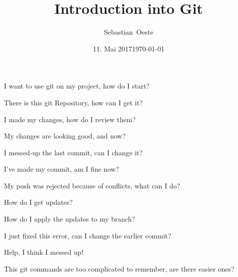 \documentclass[11pt]{beamer}
\date{11. Mai 2017}
\institute[ZIH TUD]{Zentrum f\"{u}r Informationsdienste und Hochleistungsrechnen -- TU Dresden}
\title[LCTP]{Introduction into Git}
\author[Oeste]{Sebastian~Oeste}
\date{\today}
\begin{document}
\zihmaketitle



\begin{frame}[fragile]{I want to use git on my project, how do I start?}
\end{frame}

\begin{frame}[fragile]{There is this git Repository, how can I get it?}
\end{frame}

\begin{frame}[fragile]{I made my changes, how do I review them?}
\end{frame}

\begin{frame}[fragile]{My changes are looking good, and now?}
\end{frame}

\begin{frame}[fragile]{I messed-up the last commit, can I change it?}
\end{frame}

\begin{frame}[fragile]{I've made my commit, am I fine now?}
\end{frame}

\begin{frame}[fragile]{My push was rejected because of conflicts, what can I do?}
\end{frame}

\begin{frame}[fragile]{How do I get updates?}
\end{frame}

\begin{frame}[fragile]{How do I apply the updates to my branch?}
\end{frame}

\begin{frame}[fragile]{I just fixed this error, can I change the earlier commit?}
\end{frame}

\begin{frame}[fragile]{Help, I think I messed up!}
\end{frame}

\begin{frame}[fragile]{This git commands are too complicated to remember, are there easier ones?}
\end{frame}
\end{document}
